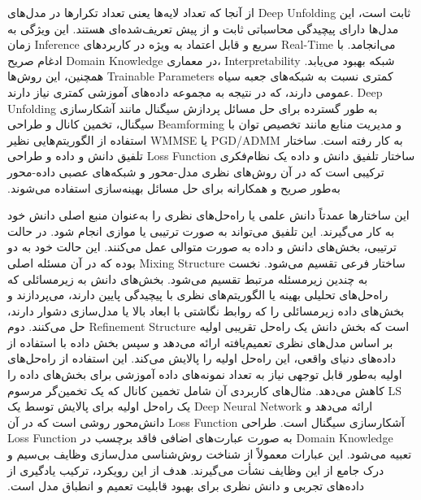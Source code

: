 از آنجا که تعداد لایه‌ها یعنی تعداد تکرارها در مدل‌های 
\gls{Deep Unfolding}
 ثابت است، این مدل‌ها دارای پیچیدگی محاسباتی ثابت و از پیش تعریف‌شده‌ای هستند. این ویژگی به زمان 
\gls{Inference}
 سریع و قابل اعتماد به ویژه در کاربردهای 
\gls{Real-Time}
  می‌انجامد.‬ با ادغام صریح 
\gls{Domain Knowledge}
   در معماری،
\gls{Interpretability}   
    شبکه بهبود می‌یابد. همچنین، این روش‌ها 
\glspl{Trainable Parameter}
     کمتری نسبت به شبکه‌های جعبه سیاه عمومی دارند، که در نتیجه به مجموعه داده‌های آموزشی کمتری نیاز دارند.‬
\gls{Deep Unfolding}
به طور گسترده برای حل مسائل پردازش سیگنال مانند آشکارسازی سیگنال، تخمین کانال و طراحی 
\gls{Beamforming}
 و مدیریت منابع مانند تخصیص توان با استفاده از الگوریتم‌هایی نظیر 
\gls{WMMSE}
  یا 
\gls{PGD}/\gls{ADMM}
   به کار رفته است.‬ ساختار تلفیق دانش و داده و طراحی
\gls{Loss Function}
‫ساختار تلفیق دانش و داده یک نظام‌فکری ترکیبی است که در آن روش‌های نظری مدل-محور و شبکه‌های عصبی داده-محور به‌طور صریح و همکارانه برای حل مسائل بهینه‌سازی استفاده می‌شوند.

 این ساختارها عمدتاً دانش علمی یا راه‌حل‌های نظری را به‌عنوان منبع اصلی دانش خود به کار می‌گیرند. این تلفیق می‌تواند به صورت ترتیبی یا موازی انجام شود.‬
در حالت ترتیبی، بخش‌های دانش و داده به صورت متوالی عمل می‌کنند. این حالت خود به دو ساختار فرعی تقسیم می‌شود.‬‫ نخست 
\gls{Mixing Structure}
 بوده که در آن مسئله اصلی به چندین زیرمسئله مرتبط تقسیم می‌شود. بخش‌های دانش به زیرمسائلی که راه‌حل‌های تحلیلی بهینه یا الگوریتم‌های نظری با پیچیدگی پایین دارند، می‌پردازند و بخش‌های داده زیرمسائلی را که روابط نگاشتی با ابعاد بالا یا مدل‌سازی دشوار دارند، حل می‌کنند.‬
دوم 
\gls{Refinement Structure}
است که بخش دانش یک راه‌حل تقریبی اولیه بر اساس مدل‌های نظری تعمیم‌یافته ارائه می‌دهد و سپس بخش داده با استفاده از داده‌های دنیای واقعی، این راه‌حل اولیه را پالایش می‌کند. این استفاده از راه‌حل‌های اولیه به‌طور قابل توجهی نیاز به تعداد نمونه‌های داده آموزشی برای بخش‌های داده را کاهش می‌دهد. مثال‌های کاربردی آن شامل تخمین کانال که یک تخمین‌گر مرسوم 
\gls{LS}
 یک راه‌حل اولیه برای پالایش توسط یک 
\gls{Deep Neural Network}
  ارائه می‌دهد و آشکارسازی سیگنال است.‬
‫طراحی 
\gls{Loss Function}
 دانش‌محور روشی است که در آن 
\gls{Domain Knowledge}
  به صورت عبارت‌های اضافی فاقد برچسب در 
\gls{Loss Function}
   تعبیه می‌شود. این عبارات معمولاً از شناخت روش‌شناسی مدل‌سازی وظایف بی‌سیم و درک جامع از این وظایف نشأت می‌گیرند. هدف از این رویکرد، ترکیب یادگیری از داده‌های تجربی و دانش نظری برای بهبود قابلیت تعمیم و انطباق مدل است.‬
   
